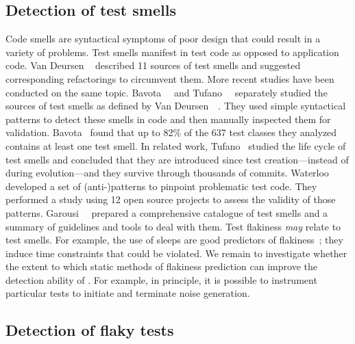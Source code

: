 \documentclass[conference]{IEEEtran}
\begin{document}
\subsection{Detection of test smells}

Code smells are syntactical symptoms of poor design that could result in a variety of problems. Test smells manifest in test code as opposed to application code. Van Deursen \etal{}~\cite{van2001refactoring} described 11 sources of test smells and suggested corresponding refactorings to circumvent them. More recent studies have been conducted on the same topic. Bavota~\etal{}~\cite{bavota2012empirical} and Tufano~\etal{}~\cite{tufano2016empirical} separately studied the sources of test smells as defined by Van Deursen~\etal{}~\cite{van2001refactoring}. They used simple syntactical patterns to detect these smells in code and then manually inspected them for validation. Bavota~\etal{} found that up to 82\% of the 637 test classes they analyzed contains at least one test smell. In related work, Tufano~\etal{} studied the life cycle of test smells and concluded that they are introduced since test creation---instead of during evolution---and they survive through thousands of commits. Waterloo~\etal{}~\cite{Waterloo:2015} developed a set of (anti-)patterns to pinpoint problematic test code. They performed a study using 12 open source projects to assess the validity of those patterns. 
Garousi~\etal{}~\cite{garousi2018we} prepared a comprehensive catalogue of test smells and a summary of guidelines and tools to deal with them. Test flakiness \emph{may} relate to test smells. For example, the use of sleeps are good predictors of flakiness~\cite{pinto-etal-msr2020,palomba2018automatic}; they induce time constraints that could be violated. We remain to investigate whether the extent to which static methods of flakiness prediction can improve the detection ability of \tname{}. For example, in principle, it is possible to instrument particular tests to initiate and terminate noise generation.

\subsection{Detection of flaky tests} 
\end{document}
